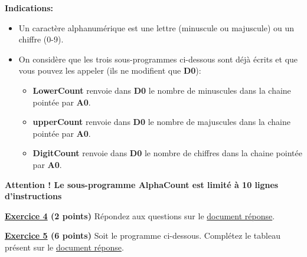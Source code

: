 \documentclass{article}
\begin{document}
\textbf{Indications:}
\begin{itemize}
    \item Un caractère alphanumérique est une lettre (minuscule ou majuscule) ou un chiffre (0-9).
    \item On considère que les trois sous-programmes ci-dessous sont déjà écrits et que vous pouvez les appeler (ils ne modifient que \textbf{D0}):
    \begin{itemize}
        \item \textbf{LowerCount} renvoie dans \textbf{D0} le nombre de minuscules dans la chaine pointée par \textbf{A0}.
        \item \textbf{upperCount} renvoie dans \textbf{D0} le nombre de majuscules dans la chaine pointée par \textbf{A0}.
        \item \textbf{DigitCount} renvoie dans \textbf{D0} le nombre de chiffres dans la chaine pointée par \textbf{A0}.
    \end{itemize}
\end{itemize}

\textbf{Attention ! Le sous-programme AlphaCount est limité à 10 lignes d'instructions}\newline\newline

\textbf{\underline{Exercice 4} (2 points)}
Répondez aux questions sur le \underline{document réponse}.\newline\newline

\textbf{\underline{Exercice 5} (6 points)}\newline
Soit le programme ci-dessous. Complétez le tableau présent sur le \underline{document réponse}.
\end{document}
